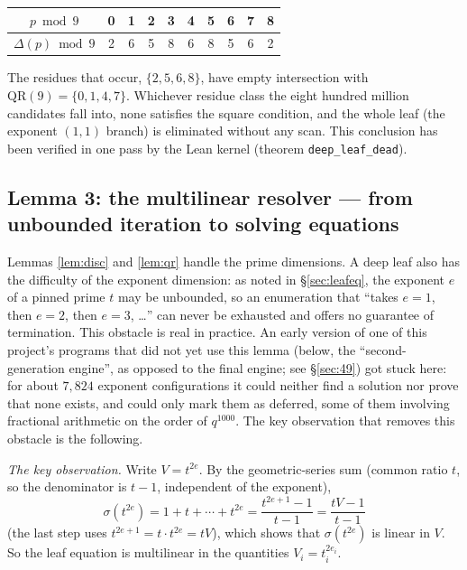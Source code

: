 \documentclass[11pt]{article}
\theoremstyle{remark}
\newcommand{\QR}{\mathrm{QR}}
\begin{document}
\begin{center}
\begin{tabular}{c|ccccccccc} $p \bmod 9$ & 0 & 1 & 2 & 3 & 4 & 5 & 6 & 7 & 8 \\ \hline $\Delta(p) \bmod 9$ & 2 & 6 & 5 & 8 & 6 & 8 & 5 & 6 & 2 \\
\end{tabular}
\end{center}

The residues that occur, $\{2, 5, 6, 8\}$, have empty intersection with $\QR(9) = \{0, 1, 4, 7\}$. Whichever residue class the eight hundred million candidates fall into, none satisfies the square condition, and the whole leaf (the exponent $(1,1)$ branch) is eliminated without any scan. This conclusion has been verified in one pass by the Lean kernel (theorem \texttt{deep\_leaf\_dead}).

\subsection{Lemma 3: the multilinear resolver --- from unbounded iteration to solving equations}\label{sec:lem3}

Lemmas \ref{lem:disc} and \ref{lem:qr} handle the prime dimensions. A deep leaf also has the difficulty of the exponent dimension: as noted in \S\ref{sec:leafeq}, the exponent $e$ of a pinned prime $t$ may be unbounded, so an enumeration that ``takes $e = 1$, then $e = 2$, then $e = 3$, \dots'' can never be exhausted and offers no guarantee of termination. This obstacle is real in practice. An early version of one of this project's programs that did not yet use this lemma (below, the ``second-generation engine'', as opposed to the final engine; see \S\ref{sec:49}) got stuck here: for about $7{,}824$ exponent configurations it could neither find a solution nor prove that none exists, and could only mark them as deferred, some of them involving fractional arithmetic on the order of $q^{1000}$. The key observation that removes this obstacle is the following.

\emph{The key observation.} Write $V = t^{2e}$. By the geometric-series sum (common ratio $t$, so the denominator is $t - 1$, independent of the exponent),
\[ \sigma(t^{2e}) = 1 + t + \cdots + t^{2e} = \frac{t^{2e+1} - 1}{t - 1} = \frac{tV - 1}{t - 1}
\] (the last step uses $t^{2e+1} = t \cdot t^{2e} = tV$), which shows that $\sigma(t^{2e})$ is linear in $V$. So the leaf equation is multilinear in the quantities $V_i = t_i^{2e_i}$.
\end{document}
